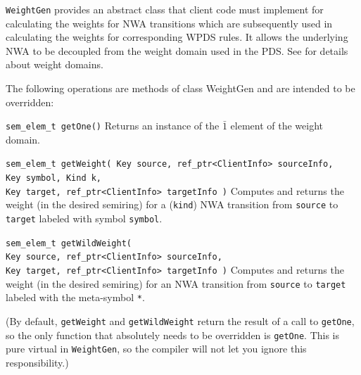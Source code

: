 \texttt{WeightGen} provides an abstract class that client code must implement for
calculating the weights for NWA transitions which are subsequently used in
calculating the weights for corresponding WPDS rules.  It allows the
underlying NWA to be decoupled from the weight domain used in the PDS.  See
\cite[\S4-\S5]{wali} for details about weight domains.


\noindent The following operations are methods of class WeightGen and are intended to be overridden:

\begin{description} 
  \item \texttt{sem\_elem\_t getOne()}  \nopagebreak
    Returns an instance of the $\bar{1}$ element of the weight domain.

  \item \texttt{sem\_elem\_t getWeight( Key source, ref\_ptr<ClientInfo> sourceInfo, \\  
                              \hspace*{3.25cm} Key symbol, Kind k, \\
                              \hspace*{3.25cm} Key target, ref\_ptr<ClientInfo> targetInfo )}  \nopagebreak
    Computes and returns the weight (in the desired semiring) for a
    (\texttt{kind}) NWA transition from \texttt{source} to \texttt{target}
    labeled with symbol \texttt{symbol}.

  \item \texttt{sem\_elem\_t getWildWeight( \\
                              \hspace*{3.25cm} Key source, ref\_ptr<ClientInfo> sourceInfo, \\
                              \hspace*{3.25cm} Key target, ref\_ptr<ClientInfo> targetInfo )}  \nopagebreak
    Computes and returns the weight (in the desired semiring) for an NWA
    transition from \texttt{source} to \texttt{target} labeled with the
    meta-symbol \texttt{*}. \\
\end{description}

(By default, \texttt{getWeight} and \texttt{getWildWeight} return the result
of a call to \texttt{getOne}, so the only function that absolutely needs to be
overridden is \texttt{getOne}. This is pure virtual in \texttt{WeightGen}, so
the compiler will not let you ignore this responsibility.)


